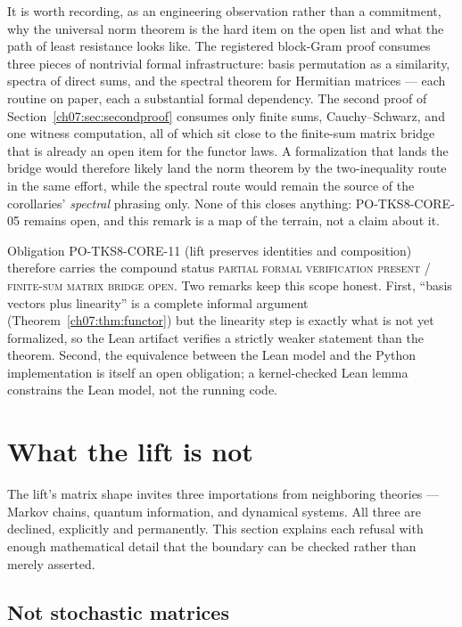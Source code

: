 \begin{remark}\label{ch07:rem:leanroute}
It is worth recording, as an engineering observation rather than a
commitment, why the universal norm theorem is the hard item on the open
list and what the path of least resistance looks like. The registered
block-Gram proof consumes three pieces of nontrivial formal
infrastructure: basis permutation as a similarity, spectra of direct sums,
and the spectral theorem for Hermitian matrices --- each routine on paper,
each a substantial formal dependency. The second proof of
Section~\ref{ch07:sec:secondproof} consumes only finite sums,
Cauchy--Schwarz, and one witness computation, all of which sit close to the
finite-sum matrix bridge that is already an open item for the functor laws.
A formalization that lands the bridge would therefore likely land the norm
theorem by the two-inequality route in the same effort, while the spectral
route would remain the source of the corollaries' \emph{spectral} phrasing
only. None of this closes anything: PO-TKS8-CORE-05 remains open, and this
remark is a map of the terrain, not a claim about it.
\end{remark}

Obligation PO-TKS8-CORE-11 (lift preserves identities and composition)
therefore carries the compound status \textsc{partial formal verification
present / finite-sum matrix bridge open}. Two remarks keep this scope honest.
First, ``basis vectors plus linearity'' is a complete informal argument
(Theorem~\ref{ch07:thm:functor}) but the linearity step is exactly what is
not yet formalized, so the Lean artifact verifies a strictly weaker
statement than the theorem. Second, the equivalence between the Lean model
and the Python implementation is itself an open obligation; a kernel-checked
Lean lemma constrains the Lean model, not the running code.

\section{What the lift is not}\label{ch07:sec:notclaims}

The lift's matrix shape invites three importations from neighboring theories
--- Markov chains, quantum information, and dynamical systems. All three are
declined, explicitly and permanently. This section explains each refusal
with enough mathematical detail that the boundary can be checked rather than
merely asserted.

\subsection{Not stochastic matrices}\label{ch07:sec:notstochastic}

